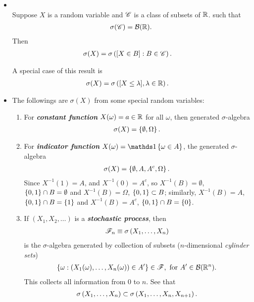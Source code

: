 \documentclass[11pt]{article}
\begin{document}
\begin{itemize}
 \item \begin{proposition} \citep{resnick2013probability}\\
Suppose $X$ is a random variable and ${\mathscr C}$ is a class of subsets of ${\mathbb R}$. such that
 \begin{align*}
 \sigma({\mathscr C}) = {\mathcal B}({\mathbb R}).
 \end{align*}
Then
\begin{align*}
\sigma(X) &= \sigma\left([X \in B]: B \in {\mathscr C}\right).
\end{align*}
\end{proposition}
A special case of this result is
\begin{align*}
\sigma(X) &= \sigma\left([X \le \lambda], \lambda \in {\mathbb R}\right).
\end{align*}

\item \begin{example}
The followings are $\sigma(X)$ from some special random variables:
\begin{enumerate}
\item For \textbf{\emph{constant function}} $X(\omega) = a\in {\mathbb R}$ for all $\omega$, then generated $\sigma$-algebra 
\begin{align*}
\sigma(X) = \left\{\emptyset, \Omega\right\}.
\end{align*}


\item For \textbf{\emph{indicator function}} $X(\omega) = \ind{\omega \in A}$, the generated $\sigma$-algebra
\begin{align*}
\sigma(X) = \left\{\emptyset, A, A^{c}, \Omega\right\}.
\end{align*} Since $X^{-1}({1})= A$, and  $X^{-1}({0})= A^{c}$, so $X^{-1}(B)= \emptyset$, $\left\{0,1\right\}\cap B = \emptyset$ and $X^{-1}(B)= \Omega$, $\left\{0,1\right\}\subset B$; similarly, $X^{-1}(B)= A$, $\left\{0,1\right\}\cap B = \left\{1\right\}$  and $X^{-1}(B)= A^{c}$, $\left\{0,1\right\}\cap B = \left\{0\right\}$.

\item If $(X_{1}, X_2, \ldots )$ is a \emph{\textbf{stochastic process}}, then 
\begin{align*}
{\mathscr F}_{n}\equiv \sigma\left(X_{1},\ldots, X_{n}\right)
\end{align*}
is the $\sigma$-algebra generated by collection of subsets ($n$-dimensional \emph{cylinder sets})
\begin{align*}
\left\{\omega: (X_{1}(\omega),\ldots, X_{n}(\omega))\in A' \right\} \in {\mathscr F},\text{ for } A'\in {\mathcal B}({\mathbb R}^{n}). 
\end{align*} This collects all information from $0$ to $n$. See that
\begin{align*}
\sigma\left(X_{1},\ldots, X_{n}\right) \subset \sigma\left(X_{1},\ldots, X_{n}, X_{n+1}\right).
\end{align*}
\end{enumerate} 
\end{example}

\end{itemize}
\end{document}

